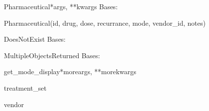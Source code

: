 \documentclass[letterpaper,10pt,english]{sphinxmanual}
\begin{document}
\hypertarget{data.models.Pharmaceutical}{}\begin{classdesc}{Pharmaceutical}{*args, **kwargs}
Bases: 

Pharmaceutical(id, drug, dose, recurrance, mode, vendor\_id, notes)

\hypertarget{data.models.Pharmaceutical.DoesNotExist}{}\begin{excdesc}{DoesNotExist}
Bases: 
\end{excdesc}

\hypertarget{data.models.Pharmaceutical.MultipleObjectsReturned}{}\begin{excdesc}{MultipleObjectsReturned}
Bases: 
\end{excdesc}

\hypertarget{data.models.Pharmaceutical.get_mode_display}{}\begin{methoddesc}[Pharmaceutical]{get\_mode\_display}{*moreargs, **morekwargs}\end{methoddesc}

\hypertarget{data.models.Pharmaceutical.treatment_set}{}\begin{memberdesc}[Pharmaceutical]{treatment\_set}\end{memberdesc}

\hypertarget{data.models.Pharmaceutical.vendor}{}\begin{memberdesc}[Pharmaceutical]{vendor}\end{memberdesc}
\end{classdesc}
\end{document}
